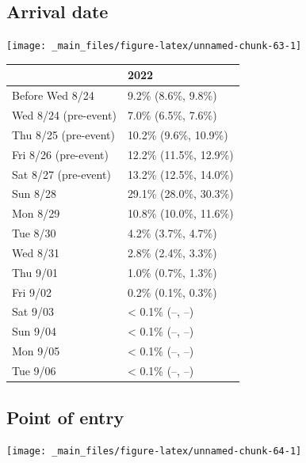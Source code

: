 \documentclass[
]{book}
\begin{document}
\hypertarget{arrival-date}{%
\subsection{Arrival date}\label{arrival-date}}

\texttt{[image: \_main\_files/figure-latex/unnamed-chunk-63-1]}

\begin{table}
\centering
\begin{tabular}[t]{>{}l|>{}l}
\hline
  & 2022\\
\hline
Before Wed 8/24 & 9.2\% (8.6\%, 9.8\%)\\
\hline
Wed 8/24 (pre-event) & 7.0\% (6.5\%, 7.6\%)\\
\hline
Thu 8/25 (pre-event) & 10.2\% (9.6\%, 10.9\%)\\
\hline
Fri 8/26 (pre-event) & 12.2\% (11.5\%, 12.9\%)\\
\hline
Sat 8/27 (pre-event) & 13.2\% (12.5\%, 14.0\%)\\
\hline
Sun 8/28 & 29.1\% (28.0\%, 30.3\%)\\
\hline
Mon 8/29 & 10.8\% (10.0\%, 11.6\%)\\
\hline
Tue 8/30 & 4.2\% (3.7\%, 4.7\%)\\
\hline
Wed 8/31 & 2.8\% (2.4\%, 3.3\%)\\
\hline
Thu 9/01 & 1.0\% (0.7\%, 1.3\%)\\
\hline
Fri 9/02 & 0.2\% (0.1\%, 0.3\%)\\
\hline
Sat 9/03 & < 0.1\% (--, --)\\
\hline
Sun 9/04 & < 0.1\% (--, --)\\
\hline
Mon 9/05 & < 0.1\% (--, --)\\
\hline
Tue 9/06 & < 0.1\% (--, --)\\
\hline
\end{tabular}
\end{table}

\hypertarget{point-of-entry}{%
\subsection{Point of entry}\label{point-of-entry}}

\texttt{[image: \_main\_files/figure-latex/unnamed-chunk-64-1]}
\end{document}
